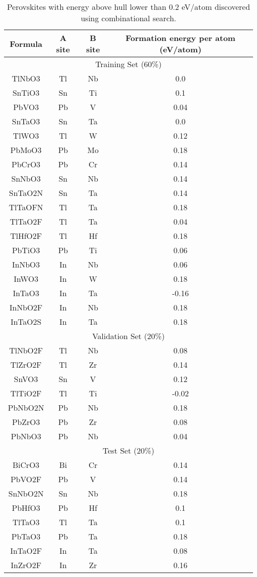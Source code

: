 \documentclass[twocolumn, prl]{revtex4-1}
\begin{document}
\begin{table}[h]\caption{Perovskites with energy above hull lower than 0.2 eV/atom discovered using combinational search. }
\begin{ruledtabular}
\begin{tabular}{cccc}
  Formula &   A site   & B site   & Formation energy per atom (eV/atom)   \\
  \hline

\multicolumn{4}{c}{Training Set (60\%)} \\
  \hline
  TlNbO3 & Tl & Nb & 0.0 \\
  SnTiO3 & Sn & Ti & 0.1 \\
  PbVO3 & Pb & V & 0.04 \\
  SnTaO3 & Sn & Ta & 0.0 \\
  TlWO3 & Tl & W & 0.12 \\
  PbMoO3 & Pb & Mo & 0.18 \\
  PbCrO3 & Pb & Cr & 0.14 \\
  SnNbO3 & Sn & Nb & 0.14 \\
  SnTaO2N & Sn & Ta & 0.14 \\
  TlTaOFN & Tl & Ta & 0.18 \\
  TlTaO2F & Tl & Ta & 0.04 \\
  TlHfO2F & Tl & Hf & 0.18 \\
  PbTiO3 & Pb & Ti & 0.06 \\
  InNbO3 & In & Nb & 0.06 \\
  InWO3 & In & W & 0.18 \\
  InTaO3 & In & Ta & -0.16 \\
  InNbO2F & In & Nb & 0.18 \\
  InTaO2S & In & Ta & 0.18 \\
\hline
\multicolumn{4}{c}{Validation Set (20\%)} \\
  \hline
  TlNbO2F & Tl & Nb & 0.08 \\
  TlZrO2F & Tl & Zr & 0.14 \\
  SnVO3 & Sn & V & 0.12 \\
  TlTiO2F & Tl & Ti & -0.02 \\
  PbNbO2N & Pb & Nb & 0.18 \\
  PbZrO3 & Pb & Zr & 0.08 \\
  PbNbO3 & Pb & Nb & 0.04 \\

\hline
\multicolumn{4}{c}{Test Set (20\%)} \\
  \hline
  BiCrO3 & Bi & Cr & 0.14 \\
  PbVO2F & Pb & V & 0.14 \\
  SnNbO2N & Sn & Nb & 0.18 \\
  PbHfO3 & Pb & Hf & 0.1 \\
  TlTaO3 & Tl & Ta & 0.1 \\
  PbTaO3 & Pb & Ta & 0.18 \\
  InTaO2F & In & Ta & 0.08 \\
  InZrO2F & In & Zr & 0.16 \\

\end{tabular}
\end{ruledtabular}
\label{tab:stable-combinational}
\end{table}
\end{document}
